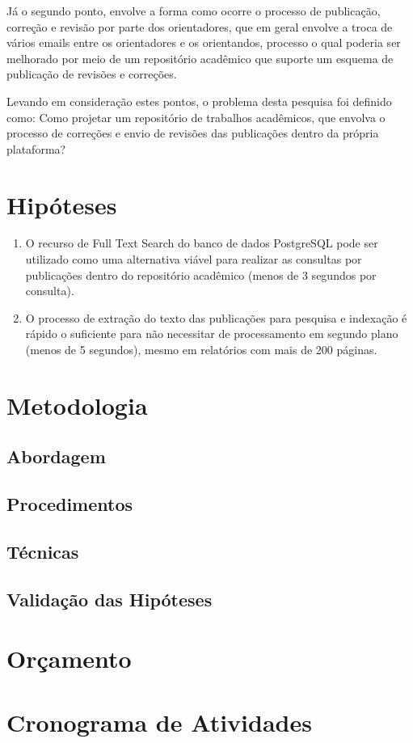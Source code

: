 Já o segundo ponto, envolve a forma como ocorre o processo de publicação, correção e revisão por parte dos orientadores, que em geral envolve a troca de vários emails entre os orientadores e os orientandos, processo o qual poderia ser melhorado por meio de um repositório acadêmico que suporte um esquema de publicação de revisões e correções.

Levando em consideração estes pontos, o problema desta pesquisa foi definido como: Como projetar um repositório de trabalhos acadêmicos, que envolva o processo de correções e envio de revisões das publicações dentro da própria plataforma?


\section{Hipóteses} \label{sec::Hypothesis}
\begin{enumerate}
    \item O recurso de Full Text Search do banco de dados PostgreSQL pode ser utilizado como uma alternativa viável para realizar as consultas por publicações dentro do repositório acadêmico (menos de 3 segundos por consulta).
    \item O processo de extração do texto das publicações para pesquisa e indexação é rápido o suficiente para não necessitar de processamento em segundo plano (menos de 5 segundos), mesmo em relatórios com mais de 200 páginas.
\end{enumerate}


\section{Metodologia} \label{sec:Methodology}

\subsection{Abordagem}

\subsection{Procedimentos}

\subsection{Técnicas}

\subsection{Validação das Hipóteses}


\section{Orçamento} \label{sec:budget}


\section{Cronograma de Atividades} \label{sec:schedule_activities_table}

